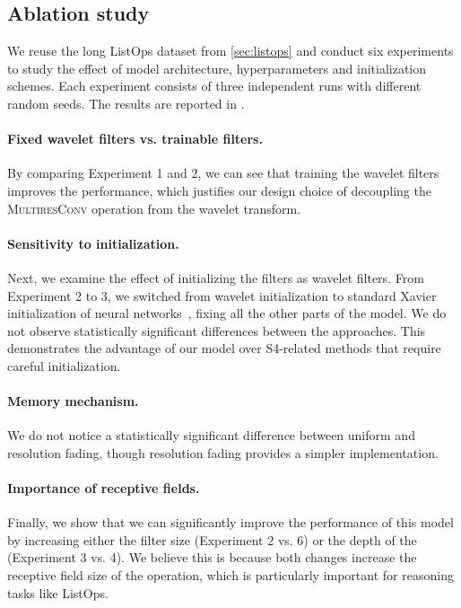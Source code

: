 \documentclass{article}
\theoremstyle{plain}
\theoremstyle{definition}
\theoremstyle{remark}
\newcommand{\prepar}{\vspace{-0.1in}}
\begin{document}
\subsection{Ablation study}
\label{sec:exp-ablation}

We reuse the long ListOps dataset from \cref{sec:listops} and conduct six experiments to study the effect of model architecture, hyperparameters and initialization schemes. 
Each experiment consists of three independent runs with different random seeds.
The results are reported in . 

\prepar
\paragraph{Fixed wavelet filters vs. trainable filters. } By comparing Experiment 1 and 2, we can see that training the wavelet filters improves the performance, which justifies our design choice of decoupling the \textsc{MultiresConv} operation from the wavelet transform. 

\prepar
\paragraph{Sensitivity to initialization. } 
Next, we examine the effect of initializing the filters as wavelet filters. 
From Experiment 2 to 3, we switched from wavelet initialization to standard Xavier initialization of neural networks~\citep{glorot2010understanding}, fixing all the other parts of the model. 
We do not observe statistically significant differences between the approaches. 
This demonstrates the advantage of our model over S4-related methods that require careful initialization. 

\prepar
\paragraph{Memory mechanism. } We do not notice a statistically significant difference between uniform and resolution fading, though resolution fading provides a simpler implementation.

\prepar
\paragraph{Importance of receptive fields. }
Finally, we show that we can significantly improve the performance of this model by increasing either the filter size (Experiment 2 vs. 6) or the depth of the  (Experiment 3 vs. 4). 
We believe this is because both changes increase the receptive field size of the  operation, which is particularly important for reasoning tasks like ListOps. 
\end{document}
